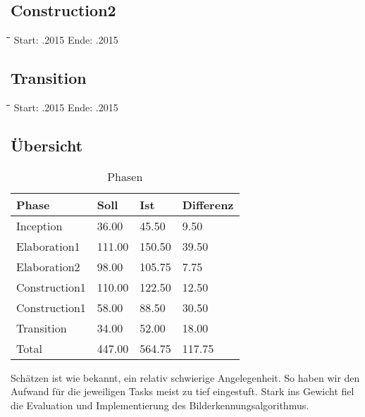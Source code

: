 \subsection{Construction2}
\begin{tabbing}[H]
    \hspace*{3cm}\=\hspace*{5cm}\=\hspace*{3cm}\=\hspace*{3cm}\= \kill
    Start: .2015 \>	Ende: .2015 \\
\end{tabbing}

\subsection{Transition}
\begin{tabbing}[H]
    \hspace*{3cm}\=\hspace*{5cm}\=\hspace*{3cm}\=\hspace*{3cm}\= \kill
    Start: .2015 \> Ende: .2015 \\
\end{tabbing}

\subsection{Übersicht}
\begin{table}[H]
\centering
    \begin{tabular}{|p{5cm}|p{2cm}|p{2cm}|p{2cm}|}
    \hline    
    \rowcolor{lightblue}
	Phase & Soll & Ist & Differenz \\ \hline
	Inception & 36.00 &	45.50 &	9.50 \\ \hline
	Elaboration1 & 111.00 & 150.50	& 39.50 \\ \hline
	Elaboration2 & 98.00 & 105.75 & 7.75 \\ \hline
	Construction1 & 110.00 & 122.50 & 12.50 \\ \hline
	Construction1 & 58.00 & 88.50 & 30.50 \\ \hline
	Transition & 34.00 & 52.00 & 18.00 \\ \hline
	\rowcolor{lightblue}
	Total & 447.00 & 564.75 & 117.75 \\ \hline
    \end{tabular}
    \caption[Phasen]{Phasen}
\end{table}
\medskip
Schätzen ist wie bekannt, ein relativ schwierige Angelegenheit. So haben wir den Aufwand für die jeweiligen Tasks meist zu tief eingestuft. Stark ins Gewicht fiel die Evaluation und Implementierung des Bilderkennungsalgorithmus.

\newpage